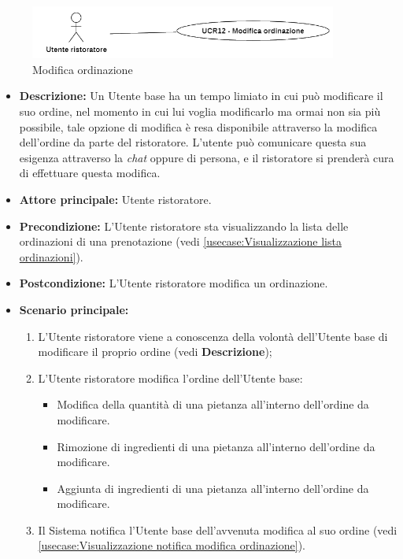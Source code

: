 \label{usecase:Modifica ordinazione}

\begin{figure}[h]
	\centering
	\includegraphics[width=0.9\textwidth]{./uml/UCR12.png} 
	\caption{Modifica ordinazione}
	\label{fig:UCR12}
  \end{figure}

\begin{itemize}

	\item \textbf{Descrizione:} Un Utente base ha un tempo limiato in cui può modificare il suo ordine, nel momento in cui lui voglia modificarlo ma ormai non sia più possibile, tale opzione di modifica è resa disponibile
	      attraverso la modifica dell'ordine da parte del ristoratore. L'utente può comunicare questa sua esigenza attraverso la \textit{chat} oppure di persona, e il ristoratore si prenderà cura di effettuare questa modifica.

	\item \textbf{Attore principale:} Utente ristoratore.

	\item \textbf{Precondizione:} L'Utente ristoratore sta visualizzando la lista delle ordinazioni di una prenotazione (vedi \autoref{usecase:Visualizzazione lista ordinazioni}).

	\item \textbf{Postcondizione:} L'Utente ristoratore modifica un ordinazione.

	\item \textbf{Scenario principale:}
	      \begin{enumerate}
		      \item L'Utente ristoratore viene a conoscenza della volontà
		            dell'Utente base di modificare il proprio ordine (vedi \textbf{Descrizione});
		      \item L'Utente ristoratore modifica l'ordine dell'Utente base:
		            \begin{itemize}
			            \item Modifica della quantità di una pietanza all'interno dell'ordine da modificare.
			            \item Rimozione di ingredienti di una pietanza all'interno dell'ordine da modificare.
			            \item Aggiunta di ingredienti di una pietanza all'interno dell'ordine da modificare.
		            \end{itemize}
		      \item Il Sistema notifica l'Utente base dell'avvenuta modifica al suo ordine (vedi \autoref{usecase:Visualizzazione notifica modifica ordinazione}).
	      \end{enumerate}

\end{itemize}
